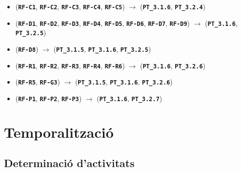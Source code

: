 \documentclass[a4paper,12pt]{ThesisStyle}
\begin{document}
\begin{itemize}
  \item (\texttt{\textbf{RF-C1}}, \texttt{\textbf{RF-C2}}, \texttt{\textbf{RF-C3}}, \texttt{\textbf{RF-C4}}, \texttt{\textbf{RF-C5}}) \hspace{1pt} $\longrightarrow$ \hspace{1pt} (\texttt{\textbf{PT\_3.1.6}}, \texttt{\textbf{PT\_3.2.4}})
  \item (\texttt{\textbf{RF-D1}}, \texttt{\textbf{RF-D2}}, \texttt{\textbf{RF-D3}}, \texttt{\textbf{RF-D4}}, \texttt{\textbf{RF-D5}}, \texttt{\textbf{RF-D6}}, \texttt{\textbf{RF-D7}}, \texttt{\textbf{RF-D9}}) \hspace{1pt} $\longrightarrow$ \hspace{1pt} (\texttt{\textbf{PT\_3.1.6}},\\
  \texttt{\textbf{PT\_3.2.5}})
  \item (\texttt{\textbf{RF-D8}}) \hspace{1pt} $\longrightarrow$ \hspace{1pt} (\texttt{\textbf{PT\_3.1.5}}, \texttt{\textbf{PT\_3.1.6}}, \texttt{\textbf{PT\_3.2.5}})
  \item (\texttt{\textbf{RF-R1}}, \texttt{\textbf{RF-R2}}, \texttt{\textbf{RF-R3}}, \texttt{\textbf{RF-R4}}, \texttt{\textbf{RF-R6}}) \hspace{1pt} $\longrightarrow$ \hspace{1pt} (\texttt{\textbf{PT\_3.1.6}}, \texttt{\textbf{PT\_3.2.6}})
  \item (\texttt{\textbf{RF-R5}}, \texttt{\textbf{RF-G3}}) \hspace{1pt} $\longrightarrow$ \hspace{1pt} (\texttt{\textbf{PT\_3.1.5}}, \texttt{\textbf{PT\_3.1.6}}, \texttt{\textbf{PT\_3.2.6}})
  \item (\texttt{\textbf{RF-P1}}, \texttt{\textbf{RF-P2}}, \texttt{\textbf{RF-P3}}) \hspace{1pt} $\longrightarrow$ \hspace{1pt} (\texttt{\textbf{PT\_3.1.6}}, \texttt{\textbf{PT\_3.2.7}})
\end{itemize}

\section{Temporalització}
\label{sec:temporalitzacio}

\subsection{Determinació d'activitats}
\label{subsec:determinacio_activitats}
\end{document}
